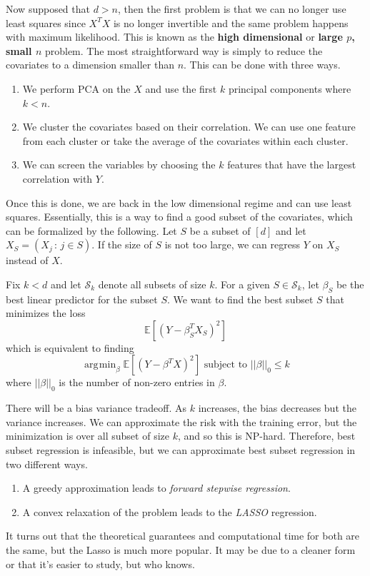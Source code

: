 \documentclass{article}
\DeclareMathOperator*{\argmin}{\arg\!\min}
\begin{document}
    Now supposed that $d > n$, then the first problem is that we can no longer use least squares since $X^T X$ is no longer invertible and the same problem happens with maximum likelihood. This is known as the \textbf{high dimensional} or \textbf{large $p$, small $n$} problem. The most straightforward way is simply to reduce the covariates to a dimension smaller than $n$. This can be done with three ways. 
    \begin{enumerate}
      \item We perform PCA on the $X$ and use the first $k$ principal components where $k < n$. 
      \item We cluster the covariates based on their correlation. We can use one feature from each cluster or take the average of the covariates within each cluster. 
      \item We can screen the variables by choosing the $k$ features that have the largest correlation with $Y$. 
    \end{enumerate}
    Once this is done, we are back in the low dimensional regime and can use least squares. Essentially, this is a way to find a good subset of the covariates, which can be formalized by the following. Let $S$ be a subset of $[d]$ and let $X_S = (X_j \,:\, j \in S)$. If the size of $S$ is not too large, we can regress $Y$ on $X_S$ instead of $X$. 

    \begin{definition}
      Fix $k < d$ and let $\mathcal{S}_k$ denote all subsets of size $k$. For a given $S \in \mathcal{S}_k$, let $\beta_S$ be the best linear predictor for the subset $S$. We want to find the best subset $S$ that minimizes the loss 
      \begin{equation}
        \mathbb{E} [ (Y - \beta_S^T X_S)^2] 
      \end{equation}
      which is equivalent to finding 
      \begin{equation}
        \argmin_{\beta} \mathbb{E} [ (Y - \beta^T X)^2] \text{ subject to } ||\beta||_0 \leq k
      \end{equation}
      where $||\beta||_0$ is the number of non-zero entries in $\beta$. 
    \end{definition}

    There will be a bias variance tradeoff. As $k$ increases, the bias decreases but the variance increases. We can approximate the risk with the training error, but the minimization is over all subset of size $k$, and so this is NP-hard. Therefore, best subset regression is infeasible, but we can approximate best subset regression in two different ways. 
    \begin{enumerate}
      \item A greedy approximation leads to \textit{forward stepwise regression}. 
      \item A convex relaxation of the problem leads to the \textit{LASSO} regression. 
    \end{enumerate}
    It turns out that the theoretical guarantees and computational time for both are the same, but the Lasso is much more popular. It may be due to a cleaner form or that it's easier to study, but who knows. 
\end{document}

